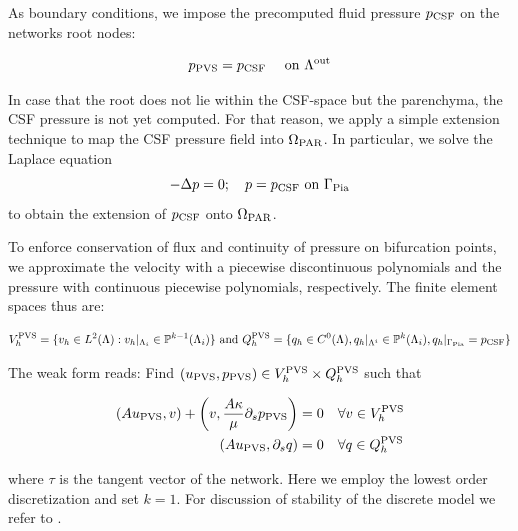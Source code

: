 As boundary conditions, we impose the precomputed fluid pressure $p_{\rm CSF}$ on the networks root nodes:

\begin{equation}
    p_{\rm PVS} = p_{\rm CSF} \quad \text{ on } \Lambda^{\rm out}
\end{equation}

In case that the root does not lie within the CSF-space but the parenchyma, the CSF pressure is not yet computed. For that reason, we apply a simple extension technique to map the CSF pressure field into $\Omega_{\rm PAR}$.
In particular, we solve the Laplace equation
\begin{equation}
    - \Delta p = 0; \quad p = p_{\rm CSF} \text{ on } \Gamma_{\rm Pia}
\end{equation}
to obtain the extension of $p_{\rm CSF}$ onto $\Omega_{\rm PAR}$.

To enforce conservation of flux and continuity of pressure on bifurcation points, we approximate the velocity with a piecewise discontinuous polynomials and the pressure with continuous piecewise polynomials, respectively. The finite element spaces thus are:

\begin{align}
   V_h^{\rm PVS} = \{v_h \in L^2(\Lambda): v_h \vert_{\Lambda_i} \in
   \mathbb{P}^{k -1}(\Lambda_i)\} \text{ and }
   Q_h^{\rm PVS} = \{ q_h \in C^0(\Lambda),  q_h \vert_{\Lambda^i} \in \mathbb{P}^k(\Lambda_i), q_h \vert_{\Gamma_{\rm Pia}} = p_{\rm CSF} \}
\end{align}

The weak form reads: Find $(u_{\rm PVS}, p_{\rm PVS}) \in V_h^{\rm PVS} \times Q_h^{\rm PVS}$ such that

\begin{align}
(A u_{\rm PVS}, v) + \left(v, \frac{A \kappa}{\mu} \partial_s p_{\rm PVS}  \right) &= 0 \quad \forall v \in V_h^{\rm PVS} \\
(A u_{\rm PVS} , \partial_s q ) &= 0 \quad  \forall q \in  Q_h^{\rm PVS}
\end{align}

where $\tau$ is the tangent vector of the network. Here we employ the lowest order discretization and set $k=1$. For discussion of stability of the discrete model we refer to \cite{gjerde2024directional}. 

